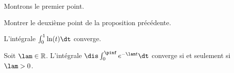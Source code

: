 \documentclass[a4paper,10pt]{report}
\begin{document}
\begin{preuve} Montrons le premier point.

%

\vspace{10cm}
\end{preuve}

\begin{exa} Montrer le deuxième point de la proposition précédente.
\end{exa}

\begin{prop} L'intégrale $\int_{0}^1 \ln(t) \dt$ converge.
\end{prop}

\begin{prop}
Soit $\lam \in \mathbb{R}$. L'intégrale $\dis \int_0^\pinf e^{-\lam t} \dt$ converge si et seulement si $\lam > 0$.
\end{prop}
\end{document}
